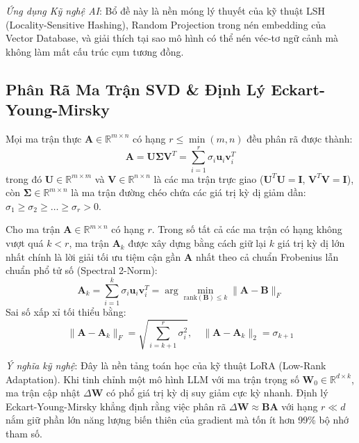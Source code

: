 \textit{Ứng dụng Kỹ nghệ AI}: Bổ đề này là nền móng lý thuyết của kỹ thuật LSH (Locality-Sensitive Hashing), Random Projection trong nén embedding của Vector Database, và giải thích tại sao mô hình có thể nén véc-tơ ngữ cảnh mà không làm mất cấu trúc cụm tương đồng.

\subsection{Phân Rã Ma Trận SVD \& Định Lý Eckart-Young-Mirsky}

\begin{theorem}
Mọi ma trận thực $\mathbf{A} \in \mathbb{R}^{m \times n}$ có hạng $r \le \min(m, n)$ đều phân rã được thành:
\begin{equation}
\mathbf{A} = \mathbf{U} \mathbf{\Sigma} \mathbf{V}^T = \sum_{i=1}^r \sigma_i \mathbf{u}_i \mathbf{v}_i^T
\end{equation}
trong đó $\mathbf{U} \in \mathbb{R}^{m \times m}$ và $\mathbf{V} \in \mathbb{R}^{n \times n}$ là các ma trận trực giao ($\mathbf{U}^T \mathbf{U} = \mathbf{I}$, $\mathbf{V}^T \mathbf{V} = \mathbf{I}$), còn $\mathbf{\Sigma} \in \mathbb{R}^{m \times n}$ là ma trận đường chéo chứa các giá trị kỳ dị giảm dần: $\sigma_1 \ge \sigma_2 \ge \dots \ge \sigma_r > 0$.
\end{theorem}

\begin{theorem}
Cho ma trận $\mathbf{A} \in \mathbb{R}^{m \times n}$ có hạng $r$. Trong số tất cả các ma trận có hạng không vượt quá $k < r$, ma trận $\mathbf{A}_k$ được xây dựng bằng cách giữ lại $k$ giá trị kỳ dị lớn nhất chính là lời giải tối ưu tiệm cận gần $\mathbf{A}$ nhất theo cả chuẩn Frobenius lẫn chuẩn phổ tử số (Spectral 2-Norm):
\begin{equation}
\mathbf{A}_k = \sum_{i=1}^k \sigma_i \mathbf{u}_i \mathbf{v}_i^T = \arg\min_{\text{rank}(\mathbf{B}) \le k} \|\mathbf{A} - \mathbf{B}\|_F
\end{equation}
Sai số xấp xỉ tối thiểu bằng:
\begin{equation}
\|\mathbf{A} - \mathbf{A}_k\|_F = \sqrt{\sum_{i=k+1}^r \sigma_i^2}, \quad \|\mathbf{A} - \mathbf{A}_k\|_2 = \sigma_{k+1}
\end{equation}
\end{theorem}

\textit{Ý nghĩa kỹ nghệ}: Đây là nền tảng toán học của kỹ thuật LoRA (Low-Rank Adaptation). Khi tinh chỉnh một mô hình LLM với ma trận trọng số $\mathbf{W}_0 \in \mathbb{R}^{d \times k}$, ma trận cập nhật $\Delta \mathbf{W}$ có phổ giá trị kỳ dị suy giảm cực kỳ nhanh. Định lý Eckart-Young-Mirsky khẳng định rằng việc phân rã $\Delta \mathbf{W} \approx \mathbf{B}\mathbf{A}$ với hạng $r \ll d$ nắm giữ phần lớn năng lượng biến thiên của gradient mà tốn ít hơn 99\% bộ nhớ tham số.

